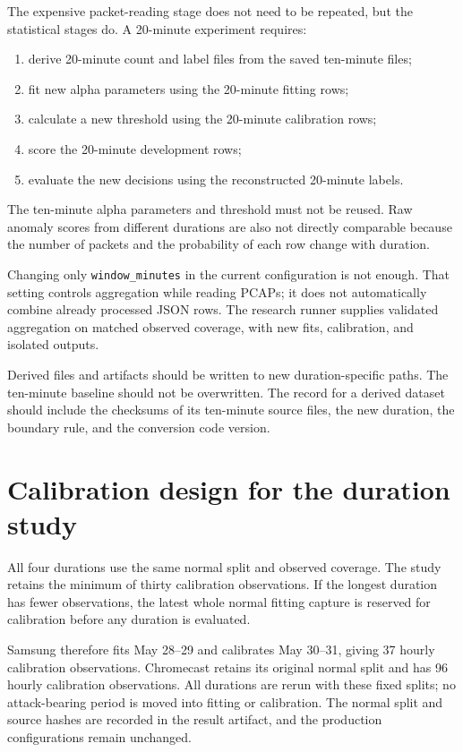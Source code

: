 \documentclass[11pt,a4paper]{article}
\begin{document}
The expensive packet-reading stage does not need to be repeated, but the
statistical stages do.  A 20-minute experiment requires:

\begin{enumerate}
  \item derive 20-minute count and label files from the saved ten-minute files;
  \item fit new alpha parameters using the 20-minute fitting rows;
  \item calculate a new threshold using the 20-minute calibration rows;
  \item score the 20-minute development rows;
  \item evaluate the new decisions using the reconstructed 20-minute labels.
\end{enumerate}

The ten-minute alpha parameters and threshold must not be reused.  Raw anomaly
scores from different durations are also not directly comparable because the
number of packets and the probability of each row change with duration.

Changing only \texttt{window\_minutes} in the current configuration is not
enough.  That setting controls aggregation while reading PCAPs; it does not
automatically combine already processed JSON rows. The research runner
 supplies validated aggregation on
matched observed coverage, with new fits, calibration, and isolated outputs.

Derived files and artifacts should be written to new duration-specific paths.
The ten-minute baseline should not be overwritten.  The record for a derived
dataset should include the checksums of its ten-minute source files, the new
duration, the boundary rule, and the conversion code version.

\section{Calibration design for the duration study}

All four durations use the same normal split and observed coverage. The study
retains the minimum of thirty calibration observations. If the longest duration
has fewer observations, the latest whole normal fitting capture is reserved
for calibration before any duration is evaluated.

Samsung therefore fits May 28--29 and calibrates May 30--31, giving 37 hourly
calibration observations. Chromecast retains its original normal split and
has 96 hourly calibration observations. All durations are rerun with these
fixed splits; no attack-bearing period is moved into fitting or calibration.
The normal split and source hashes are recorded in the result artifact, and
the production configurations remain unchanged.
\end{document}
